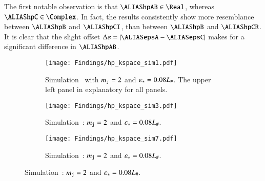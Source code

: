     The first notable observation is that $\hpAB\in \Real$, whereas $\hpC\in \Complex$. In fact, the results consistently show more resemblance between $\hpB$ and $\hpCI$, than between $\hpB$ and $\hpCR$. It is clear that the slight offset $\Delta \varepsilon = \abs{\epsA-\epsC}$ makes for a significant difference in $\hpAB$. %
    \begin{figure}[hb!]
        \centering
        \begin{subfigure}[b]{\linewidth}
            \centering
            \texttt{[image: Findings/hp\_kspace\_sim1.pdf]}
        \caption{Simulation~ with $m_{\mathtt{j}}=2$ and $\varepsilon_\ast=0.08L_\#$. The upper left panel in explanatory for all panels.}
        \label{fig:results:h11:hp_kspace_sim1}
        \end{subfigure}
        \hfill
        \begin{subfigure}[b]{\linewidth}
            \centering
            \texttt{[image: Findings/hp\_kspace\_sim3.pdf]}
        \caption{Simulation~: $m_{\mathtt{j}}=2$ and $\varepsilon_\ast=0.08L_\#$.}
        \label{fig:results:h11:hp_kspace_sim3}
        \end{subfigure}
        \hfill
        \begin{subfigure}[b]{\linewidth}
            \centering
            \texttt{[image: Findings/hp\_kspace\_sim7.pdf]}
        \caption{Simulation~: $m_{\mathtt{j}}=2$ and $\varepsilon_\ast=0.08L_\#$.}
        \label{fig:results:h11:hp_kspace_sim7}
        \end{subfigure}
    \end{figure}
